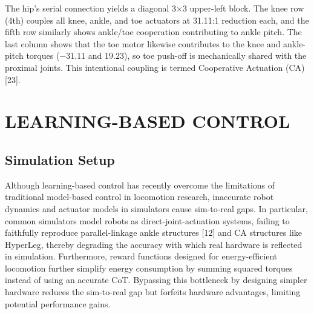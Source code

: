 \documentclass[10pt,twocolumn]{ICCAS}
\begin{document}
The hip's serial connection yields a diagonal 3$\times$3 upper-left block. 
The knee row (4th) couples all knee, ankle, and toe actuators at 31.11:1 
reduction each, and the fifth row similarly shows ankle/toe cooperation contributing 
to ankle pitch. The last column shows that the toe motor likewise contributes to the knee and
ankle-pitch torques ($-31.11$ and $19.23$), so toe push-off is mechanically shared with the
proximal joints. This intentional coupling is termed Cooperative Actuation (CA) [23].


\section{LEARNING-BASED CONTROL}
\subsection{Simulation Setup}
Although learning-based control has recently overcome the limitations of traditional model-based control 
in locomotion research, inaccurate robot dynamics and actuator models in simulators cause
sim-to-real gaps. In particular, common simulators model robots as direct-joint-actuation systems, failing to
faithfully reproduce parallel-linkage ankle structures [12] and CA structures like HyperLeg, thereby degrading
the accuracy with which real hardware is reflected in simulation. Furthermore, reward
functions designed for energy-efficient locomotion further simplify energy consumption by 
summing squared torques instead of using an accurate CoT. Bypassing this bottleneck by designing simpler hardware 
reduces the sim-to-real gap but forfeits hardware advantages, limiting potential performance gains.
\end{document}
